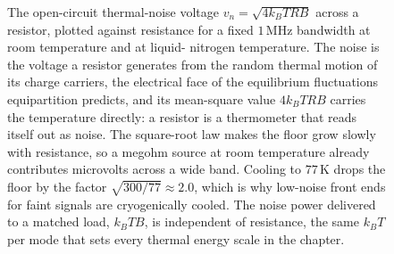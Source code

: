 \begin{figure}[htbp]
\centering
{}
\caption[Johnson-Nyquist thermal noise across a resistor]{The open-circuit
thermal-noise voltage $v_n=\sqrt{4k_B T R B}$ across a resistor, plotted against
resistance for a fixed $1\,\text{MHz}$ bandwidth at room temperature and at liquid-
nitrogen temperature. The noise is the voltage a resistor generates from the random
thermal motion of its charge carriers, the electrical face of the equilibrium
fluctuations equipartition predicts, and its mean-square value $4k_B T R B$ carries
the temperature directly: a resistor is a thermometer that reads itself out as
noise. The square-root law makes the floor grow slowly with resistance, so a
megohm source at room temperature already contributes microvolts across a wide
band. Cooling to $77\,\si{\kelvin}$ drops the floor by the factor
$\sqrt{300/77}\approx2.0$, which is why low-noise front ends for faint signals are
cryogenically cooled. The noise power delivered to a matched load, $k_B T B$, is
independent of resistance, the same $k_B T$ per mode that sets every thermal energy
scale in the chapter.}
\label{fig:vol04ch04:thermal-noise}
\end{figure}
